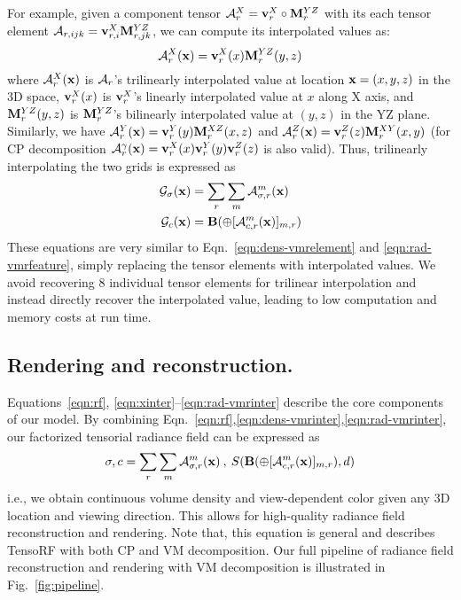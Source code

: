 \documentclass[runningheads]{llncs}
\begin{document}
For example, given a component tensor $\mathcal{A}^X_r=\mathbf{v}_r^X \circ \mathbf{M}_r^{YZ}$ with its each tensor element $\mathcal{A}_{r,ijk}=\mathbf{v}_{r,i}^X \mathbf{M}_{r,jk}^{YZ}$, we can compute its interpolated values as:
\begin{equation}
    \mathcal{A}^X_r(\mathbf{x}) = \mathbf{v}_r^X(x)\mathbf{M}_{r}^{YZ}(y,z)
    \label{eqn:xinter}
\end{equation}
where $\mathcal{A}^X_r(\mathbf{x})$ is $\mathcal{A}_r$'s trilinearly interpolated value at location $\mathbf{x}=(x,y,z)$ in the 3D space, $\mathbf{v}_r^X(x)$ is $\mathbf{v}_r^X$'s linearly interpolated value at $x$ along X axis, and $\mathbf{M}_{r}^{YZ}(y,z)$ is $\mathbf{M}_{r}^{YZ}$'s bilinearly interpolated value at $(y,z)$ in the YZ plane. Similarly, we have $\mathcal{A}^Y_r(\mathbf{x}) = \mathbf{v}_r^Y(y)\mathbf{M}_{r}^{XZ}(x,z)$ and $\mathcal{A}^Z_r(\mathbf{x}) = \mathbf{v}_r^Z(z)\mathbf{M}_{r}^{XY}(x,y)$ (for CP decomposition $\mathcal{A}^\gamma_r(\mathbf{x}) = \mathbf{v}_r^X(x)\mathbf{v}_r^Y(y)\mathbf{v}_r^Z(z)$ is also valid).
Thus, trilinearly interpolating the two grids is expressed as
\begin{align}
    \mathcal{G}_{\sigma}(\mathbf{x}) &= \sum_r \sum_m \mathcal{A}^m_{\sigma,r}(\mathbf{x}) 
    \label{eqn:dens-vmrinter}
    \\
    \mathcal{G}_{c}(\mathbf{x}) &=  \mathbf{B}(\oplus[\mathcal{A}^m_{c,r}(\mathbf{x})]_{m,r})
    \label{eqn:rad-vmrinter}
\end{align}
These equations are very similar to Eqn.~\ref{eqn:dens-vmrelement} and \ref{eqn:rad-vmrfeature}, simply replacing the tensor elements with interpolated values.
We avoid recovering 8 individual tensor elements for trilinear interpolation and instead directly recover the interpolated value, leading to low computation and memory costs at run time.


\subsection{Rendering and reconstruction.}
\label{sec:rendering_reconstruction}
Equations~\ref{eqn:rf}, \ref{eqn:xinter}--\ref{eqn:rad-vmrinter} describe the core components of our model. By combining Eqn.~\ref{eqn:rf},\ref{eqn:dens-vmrinter},\ref{eqn:rad-vmrinter}, our factorized tensorial radiance field can be expressed as
\begin{equation}
    \sigma, c=\sum_{r}\sum_m \mathcal{A}^m_{\sigma,r}(\mathbf{x})\:,\:
    S(\mathbf{B}(\oplus[\mathcal{A}^m_{c,r}(\mathbf{x})]_{m,r}), d)
\end{equation}
i.e., we obtain continuous volume density and view-dependent color given any 3D location and viewing direction. 
This allows for high-quality radiance field reconstruction and rendering.
Note that, this equation is general and describes TensoRF with both CP and VM decomposition.
Our full pipeline of radiance field reconstruction and rendering with VM decomposition is illustrated in Fig.~\ref{fig:pipeline}.
\end{document}
